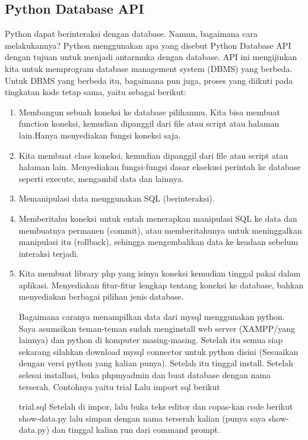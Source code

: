 \subsection {Python Database API} 
	Python dapat berinteraksi dengan database. Namun, bagaimana cara melakukannya? Python menggunakan apa yang disebut Python Database API dengan tujuan untuk menjadi antarmuka dengan database. API ini mengijinkan kita untuk memprogram database management system (DBMS) yang berbeda. Untuk DBMS yang berbeda itu, bagaimana pun juga, proses yang diikuti pada tingkatan kode tetap sama, yaitu sebagai berikut: 
	\begin{enumerate}
		\item Membangun sebuah koneksi ke database pilihanmu. Kita bisa membuat function koneksi, kemudian dipanggil dari file atau script atau halaman lain.Hanya menyediakan fungsi koneksi saja. 
		\item Kita membuat class koneksi, kemudian dipanggil dari file atau script atau halaman lain.
Menyediakan fungsi-fungsi dasar eksekusi perintah ke database seperti execute, mengambil data dan lainnya.
		\item Memanipulasi data menggunakan SQL (berinteraksi). 
		\item Memberitahu koneksi untuk entah menerapkan manipulasi SQL ke data dan membuatnya permanen (commit), atau memberitahunya untuk meninggalkan manipulasi itu (rollback), sehingga mengembalikan data ke keadaan sebelum interaksi terjadi. 
		\item Kita membuat library php yang isinya koneksi kemudian tinggal pakai dalam aplikasi. Menyediakan fitur-fitur lengkap tentang koneksi ke database, bahkan menyediakan berbagai pilihan jenis database.
	\begin{enumerate}
	
Bagaimana caranya menampilkan data dari mysql menggunakan python. Saya asumsikan teman-teman sudah menginstall web server (XAMPP/yang lainnya) dan python di komputer masing-masing. Setelah itu semua siap sekarang silahkan download mysql connector untuk python disini (Sesuaikan dengan versi python yang kalian punya). Setelah itu tinggal install. Setelah selesai installasi, buka phpmyadmin dan buat database dengan nama terserah. Contohnya yaitu trial Lalu import sql berikut

\noindent 
trial.sql 
\noindent 
Setelah di impor, lalu buka teks editor dan copas-kan code berikut 
\noindent 
show-data.py
\noindent 
lalu simpan dengan nama terserah kalian (punya saya show-data.py) dan tinggal kalian run dari command prompt.
\vspace{12pt}
\noindent 


\end{enumerate}
\end{enumerate}
